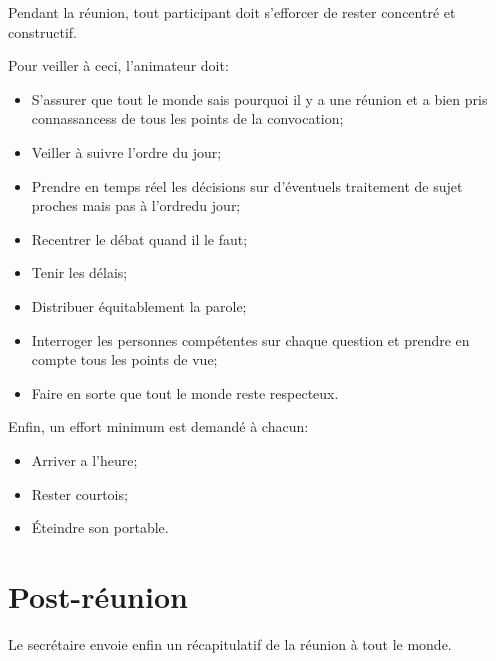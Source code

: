 \documentclass[12pt]{article}
\begin{document}
Pendant la réunion, tout participant doit s’efforcer de rester concentré et constructif.

Pour veiller à ceci, l’animateur doit:
\begin{itemize}
    \item S’assurer que tout le monde sais pourquoi il y a une réunion et a bien pris connassancess de tous les points de la convocation;
    \item Veiller à suivre l’ordre du jour;
    \item Prendre en temps réel les décisions sur d’éventuels traitement de sujet proches mais pas à l’ordredu jour;
    \item Recentrer le débat quand il le faut;
    \item Tenir les délais;
    \item Distribuer équitablement la parole;
    \item Interroger les personnes compétentes sur chaque question et prendre en compte tous les points de vue;
    \item Faire en sorte que tout le monde reste respecteux.
\end{itemize}

Enfin, un effort minimum est demandé à chacun:
\begin{itemize}
    \item Arriver a l’heure;
    \item Rester courtois;
    \item Éteindre son portable.
\end{itemize}

\section{Post-réunion}

Le secrétaire envoie enfin un récapitulatif de la réunion à tout le monde.
\end{document}
